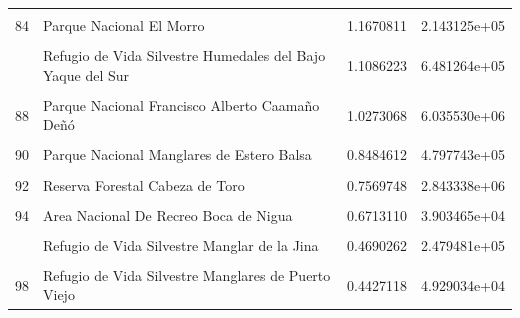 \documentclass[10pt,landscape,a3paper]{article}
\begin{document}
\begin{longtable}[t]{llrr}
\cellcolor{lightgray}{83} & \cellcolor{lightgray}{Reserva Forestal Cayuco} & \cellcolor{lightgray}{1.3722628} & \cellcolor{lightgray}{6.914752e+04}\\
84 & Parque Nacional El Morro & 1.1670811 & 2.143125e+05\\
\cellcolor{lightgray}{85} & \cellcolor{lightgray}{Refugio de Vida Silvestre Lagunas Redonda y Limón} & \cellcolor{lightgray}{1.1499667} & \cellcolor{lightgray}{3.053692e+05}\\
\addlinespace
86 & Refugio de Vida Silvestre Humedales del Bajo Yaque del Sur & 1.1086223 & 6.481264e+05\\
\cellcolor{lightgray}{87} & \cellcolor{lightgray}{Parque Nacional Cotubanamá (Del Este)} & \cellcolor{lightgray}{1.0818280} & \cellcolor{lightgray}{8.615735e+06}\\
88 & Parque Nacional Francisco Alberto Caamaño Deñó & 1.0273068 & 6.035530e+06\\
\cellcolor{lightgray}{89} & \cellcolor{lightgray}{Parque Nacional Anacaona} & \cellcolor{lightgray}{0.8662760} & \cellcolor{lightgray}{4.668627e+06}\\
90 & Parque Nacional Manglares de Estero Balsa & 0.8484612 & 4.797743e+05\\
\addlinespace
\cellcolor{lightgray}{91} & \cellcolor{lightgray}{Monumento Natural Salto de Jimenoa} & \cellcolor{lightgray}{0.8439175} & \cellcolor{lightgray}{1.471035e+05}\\
92 & Reserva Forestal Cabeza de Toro & 0.7569748 & 2.843338e+06\\
\cellcolor{lightgray}{93} & \cellcolor{lightgray}{Parque Nacional Lago Enriquillo e Isla Cabritos} & \cellcolor{lightgray}{0.6845694} & \cellcolor{lightgray}{2.772054e+06}\\
94 & Area Nacional De Recreo Boca de Nigua & 0.6713110 & 3.903465e+04\\
\cellcolor{lightgray}{95} & \cellcolor{lightgray}{Refugio de Vida Silvestre La Gran Laguna o Perucho} & \cellcolor{lightgray}{0.6343772} & \cellcolor{lightgray}{4.643403e+04}\\
\addlinespace
96 & Refugio de Vida Silvestre Manglar de la Jina & 0.4690262 & 2.479481e+05\\
\cellcolor{lightgray}{97} & \cellcolor{lightgray}{Monumento Natural Las Dunas de las Calderas} & \cellcolor{lightgray}{0.4461092} & \cellcolor{lightgray}{7.797633e+04}\\
98 & Refugio de Vida Silvestre Manglares de Puerto Viejo & 0.4427118 & 4.929034e+04\\

\end{longtable}
\end{document}
